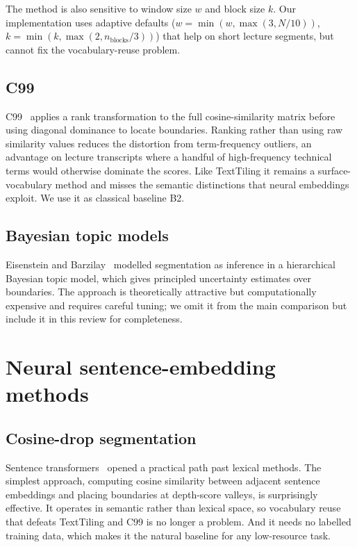 The method is also sensitive to window size $w$ and block size $k$. Our
implementation uses adaptive defaults ($w = \min(w, \max(3, N/10))$,
$k = \min(k, \max(2, n_{\text{blocks}}/3))$) that help on short lecture
segments, but cannot fix the vocabulary-reuse problem.

\subsection{C99}

C99~\cite{choi2000latent} applies a rank transformation to the full
cosine-similarity matrix before using diagonal dominance to locate
boundaries. Ranking rather than using raw similarity values reduces the
distortion from term-frequency outliers, an advantage on lecture transcripts
where a handful of high-frequency technical terms would otherwise dominate
the scores. Like TextTiling it remains a surface-vocabulary method and misses
the semantic distinctions that neural embeddings exploit. We use it as
classical baseline B2.

\subsection{Bayesian topic models}

Eisenstein and Barzilay~\cite{eisenstein2008bayesian} modelled segmentation as
inference in a hierarchical Bayesian topic model, which gives principled
uncertainty estimates over boundaries. The approach is theoretically attractive
but computationally expensive and requires careful tuning; we omit it from
the main comparison but include it in this review for completeness.

\section{Neural sentence-embedding methods}
\label{sec:neural}

\subsection{Cosine-drop segmentation}

Sentence transformers~\cite{reimers2019sbert} opened a practical path past
lexical methods. The simplest approach, computing cosine similarity between
adjacent sentence embeddings and placing boundaries at depth-score valleys, is
surprisingly effective. It operates in semantic rather than lexical space, so
vocabulary reuse that defeats TextTiling and C99 is no longer a problem. And
it needs no labelled training data, which makes it the natural baseline for
any low-resource task.

